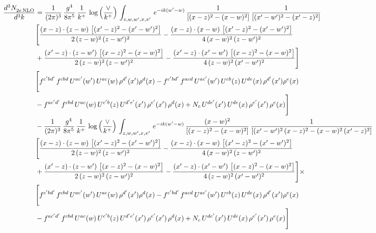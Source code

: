 \documentclass[9pt]{article}
\numberwithin{equation}{section}
\begin{document}
\begin{align}
 \frac{d^{3}N_{2e\,\rm NLO}^{\rm}}{d^{3}k}  & =  \frac{1}{(2\pi)^{3}}\, \frac{g^{4}}{8\pi^{5}}\,\frac{1}{k^{+}}\,\log{\left(\frac{\vee}{k^{+}}\right)}\,\int_{z,w,w^{\prime},x,x'}\, e^{-ik(w^{\prime}-w)}\, \frac{1}{\left[(x-z)^{2}-(x-w)^{2}\right]}\, \frac{1}{\left[(x'-w')^{2} - (x'-z)^{2}\right]} \notag \\ & \Bigg[\frac{(x-z)\cdot (z-w)\, \left[(x'-z)^{2}-(x'-w')^{2}\right]}{2\, (z-w)^{2}\, (z-w')^{2}}  - \frac{(x-z)\cdot (x-w)\,\left[(x'-z)^{2}-(x'-w')^{2}\right] }{4\,(x-w)^{2}\,(z-w')^{2}}\notag \\ & +\frac{(x'-z)\cdot (z-w')\, \left[(x-z)^{2}-(x-w)^{2}\right]}{2\, (z-w)^{2}\, (z-w')^{2}}-\frac{(x'-z)\cdot (x'-w')\, \left[(x-z)^{2}-(x-w)^{2}\right]}{4\, (z-w)^{2}\,(x'-w')^{2}}\Bigg]\notag \\ & \Bigg[f^{c'bd'}\,f^{cbd}\, U^{ac'}(w')\,U^{ac}(w)\,\rho^{d'}(x')\rho^{d}(x)- f^{c'bd'}\,f^{acd}\,U^{ac'}(w')\,U^{cb}(z)\,U^{de}(x)\,\rho^{d'}(x')\rho^{e}(x) \notag \\ & -f^{ac'd'}\,f^{cbd}\,U^{ac}(w)\,U^{c'b}(z)\,U^{d'e'}(x')\,\rho^{e'}(x')\,\rho^{d}(x) +N_{c}\,U^{de'}(x')\,U^{de}(x)\,\rho^{e'}(x')\,\rho^{e}(x)\Bigg] \notag \\ & -\frac{1}{(2\pi)^{3}}\, \frac{g^{4}}{8\pi^{5}}\,\frac{1}{k^{+}}\,\log{\left(\frac{\vee}{k^{+}}\right)}\,\int_{z,w,w^{\prime},x,x'}\, e^{-ik(w^{\prime}-w)}\,\frac{(x-w)^{2}}{\left[(x-z)^{2}-(x-w)^{2}\right]}\, \frac{1}{\left[(x'-w')^{2}\, (x-z)^{2} - (x-w)^{2}\, (x'-z)^{2}\right]} \notag \\ & \Bigg[\frac{(x-z)\cdot (z-w)\, \left[(x'-z)^{2}-(x'-w')^{2}\right]}{2\, (z-w)^{2}\, (z-w')^{2}}  - \frac{(x-z)\cdot (x-w)\,\left[(x'-z)^{2}-(x'-w')^{2}\right] }{4\,(x-w)^{2}\,(z-w')^{2}}\notag \\ & +\frac{(x'-z)\cdot (z-w')\, \left[(x-z)^{2}-(x-w)^{2}\right]}{2\, (z-w)^{2}\, (z-w')^{2}}-\frac{(x'-z)\cdot (x'-w')\, \left[(x-z)^{2}-(x-w)^{2}\right]}{4\, (z-w)^{2}\,(x'-w')^{2}}\Bigg]\times\,\notag \\ & \Bigg[f^{c'bd'}\,f^{cbd}\, U^{ac'}(w')\,U^{ac}(w)\,\rho^{d'}(x')\rho^{d}(x)- f^{c'bd'}\,f^{acd}\,U^{ac'}(w')\,U^{cb}(z)\,U^{de}(x)\,\rho^{d'}(x')\rho^{e}(x) \notag \\ & -f^{ac'd'}\,f^{cbd}\,U^{ac}(w)\,U^{c'b}(z)\,U^{d'e'}(x')\,\rho^{e'}(x')\,\rho^{d}(x) +N_{c}\,U^{de'}(x')\,U^{de}(x)\,\rho^{e'}(x')\,\rho^{e}(x)\Bigg] \notag \\

\end{align}
\end{document}
